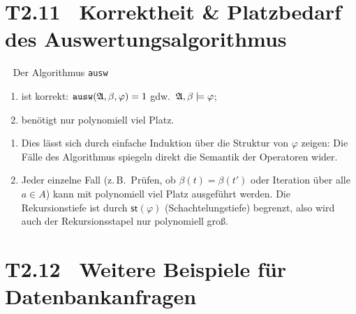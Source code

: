 \documentclass[fontsize=11pt, twoside=false, numbers=autoenddot]{scrbook}
\begin{document}
\section*{T2.11~ Korrektheit \& Platzbedarf des Auswertungsalgorithmus}

~
Der Algorithmus \texttt{ausw}
\begin{enumerate}
  \item
    ist korrekt: $\texttt{ausw}(\mathfrak{A},\beta,\varphi) = 1$ gdw.\ $\mathfrak{A},\beta \models \varphi$;
  \item
    benötigt nur polynomiell viel Platz.
\end{enumerate}
\begin{beweis}
  \begin{enumerate}
    \item
      Dies lässt sich durch einfache Induktion über die Struktur von $\varphi$ zeigen:
      Die Fälle des Algorithmus spiegeln direkt die Semantik der Operatoren wider.
    \item
      Jeder einzelne Fall (z.\,B.\ Prüfen, ob $\beta(t) = \beta(t')$
      oder Iteration über alle $a \in A$) kann mit polynomiell viel Platz
      ausgeführt werden.
      Die Rekursionstiefe ist durch $\textsf{st}(\varphi)$ (Schachtelungstiefe)
      begrenzt, also wird auch der Rekursionsstapel nur polynomiell groß.\qedhere
  \end{enumerate}
\end{beweis}%

\section*{T2.12~ Weitere Beispiele für Datenbankanfragen}
\end{document}
